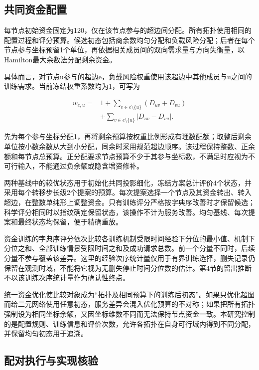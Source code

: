 \documentclass[UTF8,a4paper,twocolumn,fontset=none,zihao=5]{ctexart}
\begin{document}
\subsection{共同资金配置}

每节点初始资金固定为120，仅在该节点参与的超边间分配。所有拓扑使用相同的配置过程和评分预算。候选初态包括商余数均匀分配和负载风险分配；后者在每个节点参与坐标预留1个单位，再依据相关成员间的双向需求量与方向失衡量，以Hamilton最大余数法分配剩余资金。


具体而言，对节点u参与的超边e，负载风险权重使用该超边中其他成员与u之间的训练需求。当前冻结权重系数均为1，可写为



\begin{equation}
\begin{aligned}w_{e,u}={}&1+\sum_{v\in e\setminus\{u\}}(D_{uv}+D_{vu})\\&+\sum_{v\in e\setminus\{u\}}|D_{uv}-D_{vu}|.\end{aligned}
\label{eq:12}\end{equation}


先为每个参与坐标分配1，再将剩余预算按权重比例形成有理数配额；取整后剩余单位按小数余数从大到小分配，同余时采用规范超边顺序。该过程保持整数、正余额和每节点总预算。正分配要求节点预算不少于其参与坐标数，不满足时应视为不可行输入，不能通过负余额或隐含增资修补。


两种基线中的较优状态用于初始化共同投影细化，冻结方案总计评价4个状态，并采用每个转移步长级2个提案的预算。每次提案选择一个节点及其资金转出、转入超边，在整数单纯形上调整资金。只有训练评分严格按字典序改善时才保留候选；科学评分相同时以指纹确定保留状态，该操作不计为服务改善。均匀基线、每次提案和最终状态均保留，便于精确重放。


资金训练的字典序评分依次比较各训练机制受限时间经验下分位的最小值、机制下分位之和、全部训练情景受限时间之和及成功请求总数。前一个分量不同时，后续分量不参与覆盖该差异。这里的经验次序统计量仅用于有界训练选择，删失记录仍保留在观测时域，不能将它视为无删失停止时间分位数的估计。第4节的留出推断不以该训练次序统计量作为确认性终点。


统一资金优化使比较对象成为“拓扑及相同预算下的训练后初态”。如果只优化超图而给二元网络使用任意初态，服务差异会混入优化预算的不对称；如果把所有拓扑强制设为相同坐标余额，又因坐标维数不同而无法保持节点资金一致。本研究控制的是配置规则、训练信息和评价次数，允许各拓扑在自身可行域内得到不同分配，并保留均匀初态用于追溯。


\subsection{配对执行与实现核验}
\end{document}
